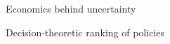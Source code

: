 \begin{frame}{Economics behind uncertainty}
  \begin{figure}[h!]\centering
  \end{figure}
\end{frame}
\begin{frame}{Decision-theoretic ranking of policies}
  \begin{figure}[h!]\centering
  \end{figure}
\end{frame}
